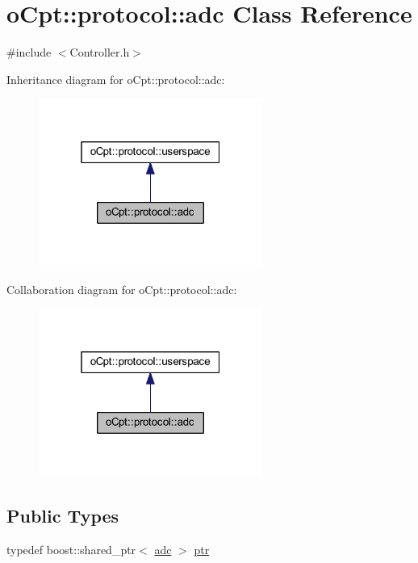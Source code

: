 \hypertarget{classo_cpt_1_1protocol_1_1adc}{}\section{o\+Cpt\+:\+:protocol\+:\+:adc Class Reference}
\label{classo_cpt_1_1protocol_1_1adc}


{\ttfamily \#include $<$Controller.\+h$>$}



Inheritance diagram for o\+Cpt\+:\+:protocol\+:\+:adc\+:
\nopagebreak
\begin{figure}[H]
\begin{center}
\leavevmode
\includegraphics[width=208pt]{classo_cpt_1_1protocol_1_1adc__inherit__graph}
\end{center}
\end{figure}


Collaboration diagram for o\+Cpt\+:\+:protocol\+:\+:adc\+:
\nopagebreak
\begin{figure}[H]
\begin{center}
\leavevmode
\includegraphics[width=208pt]{classo_cpt_1_1protocol_1_1adc__coll__graph}
\end{center}
\end{figure}
\subsection*{Public Types}
\begin{DoxyCompactItemize}
\item 
typedef boost\+::shared\+\_\+ptr$<$ \hyperlink{classo_cpt_1_1protocol_1_1adc}{adc} $>$ \hyperlink{classo_cpt_1_1protocol_1_1adc_a94af68cb9c573629a4a1a16f8ebd3dff}{ptr}
\end{DoxyCompactItemize}

